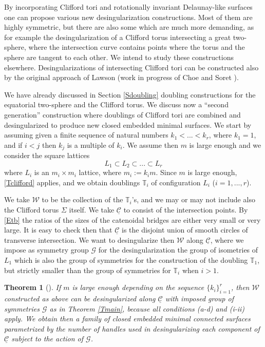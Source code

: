 \documentclass[12pt,namelimits,sumlimits]{amsart}
\newtheorem{theorem}{Theorem}[section]
\theoremstyle{remark}
\numberwithin{equation}{section}
\begin{document}
By incorporating Clifford tori and rotationally invariant Delaunay-like surfaces
one can propose various new desingularization constructions.
Most of them are highly symmetric,
but there are also some which are much more demanding,
as for example the desingularization of a Clifford torus intersecting a great two-sphere,
where the intersection curve contains points where the torus and the sphere are tangent to each other.
We intend to study these constructions elsewhere.
Desingularizations of intersecting Clifford tori can be constructed also by the original approach of Lawson
(work in progress of Choe and Soret \cite{jaiyoung}).

We have already discussed in Section \ref{Sdoubling} doubling constructions for the equatorial two-sphere
and the Clifford torus.
We discuss now a ``second generation'' construction where doublings of Clifford tori are combined and desingularized
to produce new closed embedded minimal surfaces.
We start by assuming given a finite sequence of natural numbers $k_1< ... <k_r$,
where $k_1=1$,
and if $i<j$ then $k_j$ is a multiple of $k_i$.
We assume then $m$ is large enough and
we consider the square lattices 
$$
L_1\subset L_2\subset ... \subset L_r
$$
where $L_i$ is an $m_i\times m_i$ lattice,
where $m_i:=k_i m$.
Since $m$ is large enough,
\ref{Tclifford} applies,
and we obtain doublings ${\mathbb{T}}_i$ of configuration $L_i$ ($i=1,...,r$).

We take ${{\mathcal{W}}}$ to be the collection of the ${\mathbb{T}}_i$'s,
and we may or may not include also the Clifford torus $\Sigma$ itself.
We take ${\underline{{\mathcal{C}}}}$ to consist of the intersection points.
By \ref{Etb} the ratios of the sizes of the catenoidal bridges are either
very small or very large.
It is easy to check then that ${\underline{{\mathcal{C}}}}$
is the disjoint union of smooth circles of transverse intersection.
We want to desingularize then ${{\mathcal{W}}}$ along ${\underline{{\mathcal{C}}}}$,
where we impose as symmetry group ${{\mathscr{G}}}$ for the desingularization 
the group of isometries of $L_1$ which is also the group of symmetries for the construction
of the doubling ${\mathbb{T}}_1$, but strictly smaller than the group of symmetries for ${\mathbb{T}}_i$ when $i>1$.

\addtocounter{equation}{1}
\begin{theorem}[\cite{kapouleas:nested}]
\label{Tnested}
If $m$ is large enough depending on the sequence $\{k_i\}_{i=1}^r$,
then ${{\mathcal{W}}}$ constructed as above can be desingularized along ${\underline{{\mathcal{C}}}}$
with imposed group of symmetries ${{\mathscr{G}}}$
as in Theorem \ref{Tmain},
because all conditions (a-d) and (i-ii) apply.
We obtain then a family of closed embedded minimal connected surfaces
parametrized by the number of handles used in desingularizing
each component of ${\underline{{\mathcal{C}}}}$ subject to the action of ${{\mathscr{G}}}$.
\end{theorem}
\end{document}
